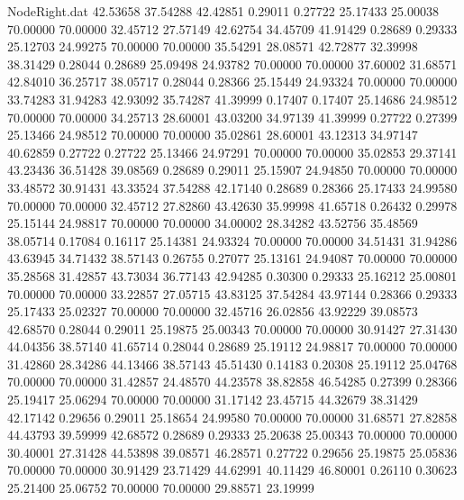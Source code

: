 \begin{filecontents}{NodeRight.dat}
  42.53658   37.54288   42.42851     0.29011    0.27722   25.17433   25.00038   70.00000   70.00000   32.45712   27.57149
  42.62754   34.45709   41.91429     0.28689    0.29333   25.12703   24.99275   70.00000   70.00000   35.54291   28.08571
  42.72877   32.39998   38.31429     0.28044    0.28689   25.09498   24.93782   70.00000   70.00000   37.60002   31.68571
  42.84010   36.25717   38.05717     0.28044    0.28366   25.15449   24.93324   70.00000   70.00000   33.74283   31.94283
  42.93092   35.74287   41.39999     0.17407    0.17407   25.14686   24.98512   70.00000   70.00000   34.25713   28.60001
  43.03200   34.97139   41.39999     0.27722    0.27399   25.13466   24.98512   70.00000   70.00000   35.02861   28.60001
  43.12313   34.97147   40.62859     0.27722    0.27722   25.13466   24.97291   70.00000   70.00000   35.02853   29.37141
  43.23436   36.51428   39.08569     0.28689    0.29011   25.15907   24.94850   70.00000   70.00000   33.48572   30.91431
  43.33524   37.54288   42.17140     0.28689    0.28366   25.17433   24.99580   70.00000   70.00000   32.45712   27.82860
  43.42630   35.99998   41.65718     0.26432    0.29978   25.15144   24.98817   70.00000   70.00000   34.00002   28.34282
  43.52756   35.48569   38.05714     0.17084    0.16117   25.14381   24.93324   70.00000   70.00000   34.51431   31.94286
  43.63945   34.71432   38.57143     0.26755    0.27077   25.13161   24.94087   70.00000   70.00000   35.28568   31.42857
  43.73034   36.77143   42.94285     0.30300    0.29333   25.16212   25.00801   70.00000   70.00000   33.22857   27.05715
  43.83125   37.54284   43.97144     0.28366    0.29333   25.17433   25.02327   70.00000   70.00000   32.45716   26.02856
  43.92229   39.08573   42.68570     0.28044    0.29011   25.19875   25.00343   70.00000   70.00000   30.91427   27.31430
  44.04356   38.57140   41.65714     0.28044    0.28689   25.19112   24.98817   70.00000   70.00000   31.42860   28.34286
  44.13466   38.57143   45.51430     0.14183    0.20308   25.19112   25.04768   70.00000   70.00000   31.42857   24.48570
  44.23578   38.82858   46.54285     0.27399    0.28366   25.19417   25.06294   70.00000   70.00000   31.17142   23.45715
  44.32679   38.31429   42.17142     0.29656    0.29011   25.18654   24.99580   70.00000   70.00000   31.68571   27.82858
  44.43793   39.59999   42.68572     0.28689    0.29333   25.20638   25.00343   70.00000   70.00000   30.40001   27.31428
  44.53898   39.08571   46.28571     0.27722    0.29656   25.19875   25.05836   70.00000   70.00000   30.91429   23.71429
  44.62991   40.11429   46.80001     0.26110    0.30623   25.21400   25.06752   70.00000   70.00000   29.88571   23.19999

\end{filecontents}
